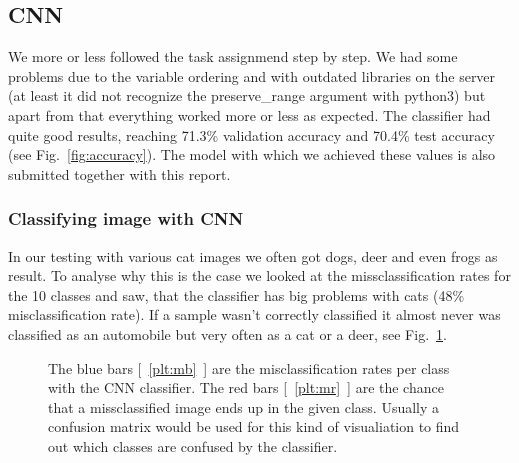 \subsection{CNN}
We more or less followed the task assignmend step by step. We had some problems due to the variable ordering and with outdated libraries on the server (at least it did not recognize the preserve\_range argument with python3) but apart from that everything worked more or less as expected. The classifier had quite good results, reaching 71.3\% validation accuracy and 70.4\% test accuracy (see Fig.~\ref{fig:accuracy}). The model with which we achieved these values is also submitted together with this report.

\subsubsection{Classifying image with CNN}
In our testing with various cat images we often got dogs, deer and even frogs as result. To analyse why this is the case we looked at the missclassification rates for the 10 classes and saw, that the classifier has big problems with cats (48\% misclassification rate). If a sample wasn't correctly classified it almost never was classified as an automobile but very often as a cat or a deer, see Fig.~\ref{fig:missrate}.


\begin{figure}[h!t]
\newcommand{\plotref}[1]{{[~\ref{plt:#1}~]}}
\centering
\caption{The  blue bars \plotref{mb} are the misclassification rates per class with the CNN classifier. The red bars \plotref{mr} are the chance that a missclassified image ends up in the given class. Usually a confusion matrix would be used for this kind of visualiation to find out which classes are confused by the classifier.} %
\label{fig:missrate}

\end{figure}



